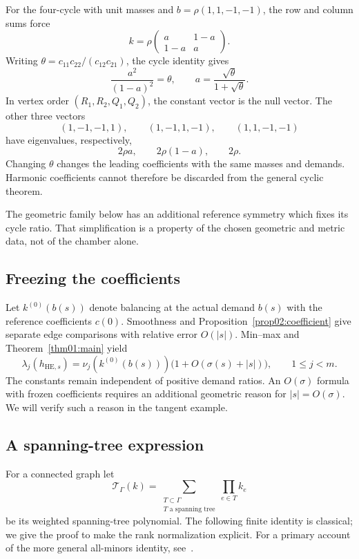 \documentclass[11pt]{amsart}
\theoremstyle{definition}
\theoremstyle{remark}
\begin{document}
For the four-cycle with unit masses and
\(b=\rho(1,1,-1,-1)\), the row and column sums force
\[
 k=\rho
 \begin{pmatrix}a&1-a\\1-a&a\end{pmatrix}.
\]
Writing \(\theta=c_{11}c_{22}/(c_{12}c_{21})\), the cycle
identity gives
\[
 \frac{a^2}{(1-a)^2}=\theta,\qquad
 a=\frac{\sqrt\theta}{1+\sqrt\theta}.
\]
In vertex order \((R_1,R_2,Q_1,Q_2)\), the constant vector is
the null vector. The other three vectors
\[
 (1,-1,-1,1),\qquad (1,-1,1,-1),\qquad(1,1,-1,-1)
\]
have eigenvalues, respectively,
\begin{equation}\label{eq06:fourcycle}
 2\rho a,\qquad 2\rho(1-a),\qquad2\rho.
\end{equation}
Changing \(\theta\) changes the leading coefficients with the
same masses and demands. Harmonic coefficients cannot therefore
be discarded from the general cyclic theorem.

The geometric family below has an additional reference symmetry
which fixes its cycle ratio. That simplification is a property of
the chosen geometric and metric data, not of the chamber alone.

\subsection{Freezing the coefficients}

Let \(k^{(0)}(b(s))\) denote balancing at the actual demand
\(b(s)\) with the reference coefficients \(c(0)\).
Smoothness and Proposition~\ref{prop02:coefficient} give
separate edge comparisons with relative error \(O(|s|)\).
Min--max and Theorem~\ref{thm01:main} yield
\begin{equation}\label{eq06:frozen}
 \lambda_j(h_{\mathrm{HE},s})
 =\nu_j(k^{(0)}(b(s)))
       \bigl(1+O(\sigma(s)+|s|)\bigr),\qquad 1\leq j<m.
\end{equation}
The constants remain independent of positive demand ratios.
An \(O(\sigma)\) formula with frozen coefficients requires an
additional geometric reason for \(|s|=O(\sigma)\). We will
verify such a reason in the tangent example.

\subsection{A spanning-tree expression}

For a connected graph let
\[
 \mathcal T_\Gamma(k)=
 \sum_{\substack{T\subset\Gamma\\T\text{ a spanning tree}}}
                  \prod_{e\in T}k_e
\]
be its weighted spanning-tree polynomial.
The following finite identity is classical; we give the proof to
make the rank normalization explicit. For a primary account of
the more general all-minors identity, see~\cite{zernik2013}.
\end{document}
